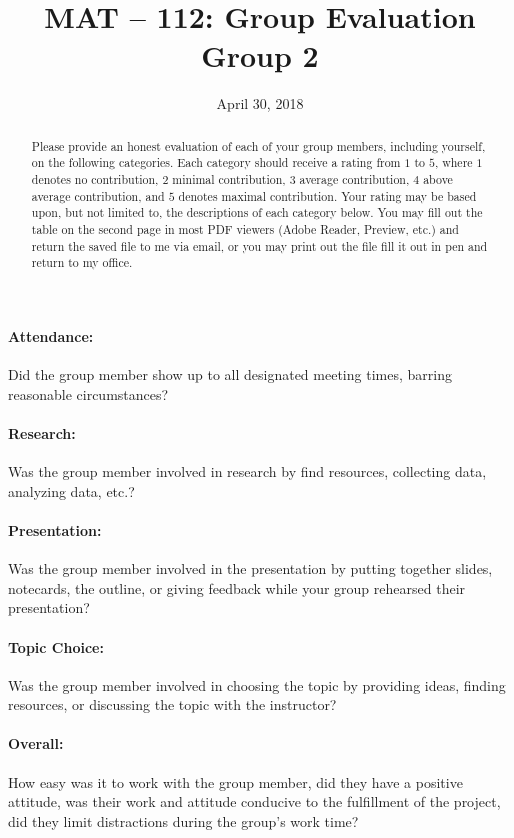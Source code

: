 \documentclass{article}
\title{MAT -- 112: Group Evaluation\\
\large{Group 2}}
\date{April 30, 2018}
\begin{document}
\maketitle

\begin{abstract}
Please provide an honest evaluation of each of your group members, including yourself, on the following categories. Each category should receive a rating from $1$ to $5$, where $1$ denotes no contribution, $2$ minimal contribution, $3$ average contribution, $4$ above average contribution, and $5$ denotes maximal contribution.  Your rating may be based upon, but not limited to, the descriptions of each category below. You may fill out the table on the second page in most PDF viewers (Adobe Reader, Preview, etc.) and return the saved file to me via email, or you may print out the file fill it out in pen and return to my office. 
\end{abstract}

\paragraph*{Attendance:} Did the group member show up to all designated meeting times, barring reasonable circumstances?
\paragraph*{Research:} Was the group member involved in research by find resources, collecting data, analyzing data, etc.?
\paragraph*{Presentation:} Was the group member involved in the presentation by putting together slides, notecards, the outline, or giving feedback while your group rehearsed their presentation?
\paragraph*{Topic Choice:} Was the group member involved in choosing the topic by providing ideas, finding resources, or discussing the topic with the instructor?
\paragraph*{Overall:} How easy was it to work with the group member, did they have a positive attitude, was their work and attitude conducive to the fulfillment of the project, did they limit distractions during the group's work time?
\end{document}
